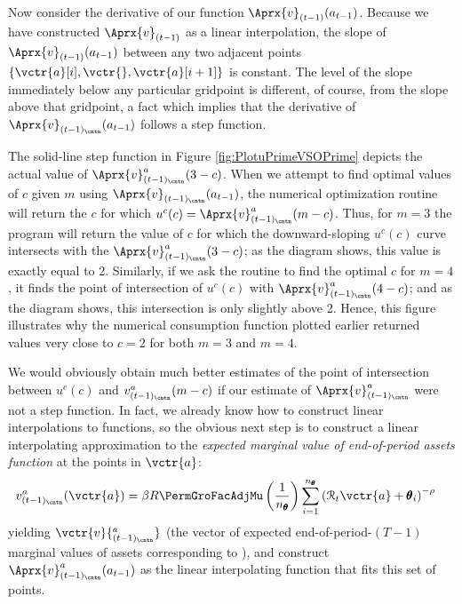 \documentclass[titlepage, headings=optiontotocandhead]{Resources/texmf-local/tex/latex/econtex}
\begin{document}
Now consider the derivative of our function $\Aprx{v}_{({t-1})}(a_{t-1})$.  Because we have
constructed $\Aprx{v}_{({t-1})}$ as a linear interpolation, the slope of
$\Aprx{v}_{({t-1})}(a_{t-1})$ between any two adjacent points
$\{\vctr{a}[i],\vctr{},\vctr{a}[{i+1}]\}$ is constant.  The level of the slope immediately below any
particular gridpoint is different, of course, from the slope above that gridpoint, a fact which
implies that the derivative of $\Aprx{v}_{({t-1})_\cntn}(a_{t-1})$ follows a step function.

The solid-line step function in Figure \ref{fig:PlotuPrimeVSOPrime} depicts the actual value of
$\Aprx{v}_{({t-1})_\cntn}^{a}(3-c)$.  When we attempt to find optimal values of
$c$ given $m$ using $\Aprx{v}_{({t-1})_\cntn}(a_{t-1})$, the numerical optimization routine will
return the $c$ for which
$u^{c}(c) = \Aprx{v}^{a}_{({t-1})_\cntn}(m-c)$.  Thus, for
$m=3$ the program will return the value of $c$ for which the downward-sloping
$u^{c}(c)$ curve intersects with the
$\Aprx{v}_{({t-1})_\cntn}^{a}(3-c)$; as the diagram shows, this value is exactly equal to 2.
Similarly, if we ask the routine to find the optimal $c$ for $m=4$, it finds the point of
intersection of $u^{c}(c)$ with $\Aprx{v}_{({t-1})_\cntn}^{a}(4-c)$; and as the diagram shows, this
intersection is only slightly above 2.  Hence, this figure illustrates why the numerical consumption
function plotted earlier returned values very close to $c=2$ for both $m=3$ and $m=4$.

We would obviously obtain much better estimates of the point of intersection between $u^{c}(c)$ and $v_{({t-1})_\cntn}^{a}(m-c)$ if our estimate of $\Aprx{v}^{a}_{({t-1})_\cntn}$ were not a step function.  In fact, we already know how to construct linear interpolations to functions, so the obvious next step is to construct a linear interpolating approximation to the \textit{expected marginal value of end-of-period assets function} at the points in $\vctr{a}$:
\begin{equation}\begin{gathered}\begin{aligned}
      v_{({t-1})_\cntn}^{a}(\vctr{a})  & =  \beta R \PermGroFacAdjMu \left(\frac{1}{n_{\TranShkEmp}}\right) \sum_{i=1}^{n_{\TranShkEmp}} \left(\RNrm_{t} \vctr{a} + \TranShkEmp_{i}\right)^{-\rho} \label{eq:vEndPrimeTm1}
    \end{aligned}\end{gathered}\end{equation}
yielding $\vctr{v}{^{a}_{({t-1})_\cntn}}$ (the vector of expected end-of-period-$(T-1)$ marginal values of assets corresponding to ),  %
and construct
$\Aprx{v}_{({t-1})_\cntn}^{a}(a_{t-1})$ as the linear
interpolating function that fits this set of points.
\end{document}
